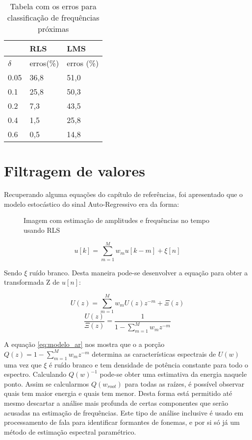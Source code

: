 \begin{table}[h]
	\centering
\begin{tabular}{|l|l|l|}
	\hline
	& RLS   & LMS        \\ \hline
	$\delta$ & erros(\%) & erros (\%) \\ \hline
	0.05  & 36,8  & 51,0       \\ \hline
	0.1   & 25,8  & 50,3       \\ \hline
	0.2   & 7,3   & 43,5       \\ \hline
	0.4   & 1,5   & 25,8       \\ \hline
	0.6   & 0,5   & 14,8       \\ \hline
	\end{tabular}
\caption{Tabela com os erros para classificação de frequências próximas}
\label{tab:tab_freq}
\end{table}

\section{Filtragem de valores}

Recuperando alguma equações do capítulo de referências, foi apresentado que o modelo estocástico do sinal Auto-Regressivo era da forma:

\begin{figure}[H]
	\centering    
	\def\svgwidth{\columnwidth}
	
	\caption{Imagem com estimação de amplitudes e frequências no tempo usando RLS}
	\label{fig:im_RLS}
\end{figure}

\begin{equation}
u[k]=\sum_{m=1}^{M}w_m u[k-m] +\xi[n]
\end{equation}

Sendo $\xi$ ruído branco. Desta maneira pode-se desenvolver a equação para obter a transformada Z de $u[n]$:

\begin{equation}
U(z)=\sum_{m=1}^{M}w_m U(z)z^{-m} +\Xi(z)
\end{equation}
\begin{equation}
\frac{U(z)}{\Xi(z)}=\frac{1}{1-\sum_{m=1}^{M}w_m z^{-m}}
\label{eq:modelo_ar}
\end{equation}


A equação \ref{eq:modelo_ar} nos mostra que o a porção $Q(z)=1-\sum_{m=1}^{M}w_m z^{-m}$ determina as características espectrais de $U(w)$ uma vez que $\xi$ é ruído branco e tem densidade de potência constante para todo o espectro. Calculando $Q(w)^{-1}$ pode-se obter uma estimativa da energia naquele ponto. Assim se calcularmos $Q(w_{root})$ para todas  as raízes, é possível observar quais tem maior energia e quais tem menor. Desta forma está permitido até mesmo descartar a análise mais profunda de certas componentes que serão acusadas na estimação de frequências. Este tipo de análise inclusive é usado em processamento de fala para identificar formantes de fonemas, e por si só já um método de estimação espectral paramétrico.

